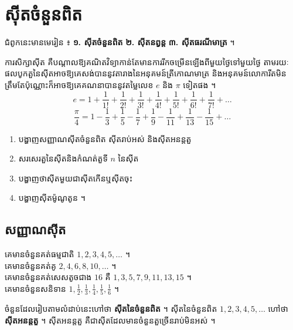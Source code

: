 \chapter{ស៊ីតចំនួនពិត}

\begin{note}[ជំពូកទី ១ ៖ ស៊ីត]
ជំពូកនេះមានមេរៀន ៖ \textbf{១. ស៊ីតចំនួនពិត} \quad \textbf{២. ស៊ីតនព្វន្ត} \quad \textbf{៣. ស៊ីតធរណីមាត្រ} ។

ការសិក្សាស៊ីត គឺបណ្ដាលឱ្យគណិតវិទ្យាកាន់តែមានការរីកចម្រើនឡើងពីមួយថ្ងៃទៅមួយថ្ងៃ តាមរយៈផលបូកតួនៃស៊ីតអាចឱ្យគេសង់បាននូវតារាងនៃអនុគមន៍ត្រីកោណមាត្រ និងអនុគមន៍លោការីតមិនត្រឹមតែប៉ុណ្ណោះក៏អាចឱ្យគេគណនាបាននូវតម្លៃលេខ $e$ និង $\pi$ ទៀតផង ។
\[
e = 1 + \frac{1}{1!} + \frac{1}{2!} + \frac{1}{3!} + \frac{1}{4!} + \frac{1}{5!} + \frac{1}{6!} + \frac{1}{7!} + \dots
\]
\[
\frac{\pi}{4} = 1 - \frac{1}{3} + \frac{1}{5} - \frac{1}{7} + \frac{1}{9} - \frac{1}{11} + \frac{1}{13} - \frac{1}{15} + \dots
\]
\end{note}

\begin{objBox}[វត្ថុបំណង]
\begin{enumerate}[1]
  \item បង្ហាញសញ្ញាណស៊ីតចំនួនពិត ស៊ីតរាប់អស់ និងស៊ីតអនន្តតួ
  \item សរសេរតួនៃស៊ីតនិងកំណត់តួទី $n$ នៃស៊ីត
  \item បង្ហាញថាស៊ីតមួយជាស៊ីតកើនឬស៊ីតចុះ
  \item បង្ហាញស៊ីតម៉ូណូតូន ។
\end{enumerate}
\end{objBox}

\section{សញ្ញាណស៊ីត}

\begin{example}[ឧទាហរណ៍ ១]
គេមានចំនួនគត់ធម្មជាតិ $1, 2, 3, 4, 5, \ldots$ ។\\
គេមានចំនួនគត់គូ $2, 4, 6, 8, 10, \ldots$ ។\\
គេមានចំនួនគត់សេសតូចជាង $16$ គឺ $1, 3, 5, 7, 9, 11, 13, 15$ ។\\
គេមានចំនួនសនិទាន $1, \frac{1}{2}, \frac{1}{3}, \frac{1}{4}, \frac{1}{5}, \frac{1}{6}$ ។
\end{example}

ចំនួនដែលរៀបតាមលំដាប់នេះហៅថា \textbf{ស៊ីតនៃចំនួនពិត} ។ ស៊ីតនៃចំនួនពិត $1, 2, 3, 4, 5, \ldots$ ហៅថា \textbf{ស៊ីតអនន្តតួ} ។ ស៊ីតអនន្តតួ គឺជាស៊ីតដែលមានចំនួនតួច្រើនរាប់មិនអស់ ។

